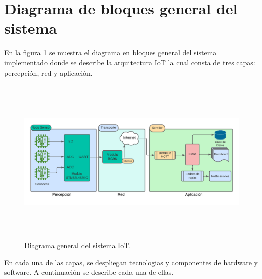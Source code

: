 \section{Diagrama de bloques general del sistema}

En la figura \ref{fig:Diagrama general del sistema IoT} se muestra el diagrama en bloques general del sistema implementado donde se describe la arquitectura IoT la cual consta de tres capas: percepción, red y aplicación.

\begin{figure}[htbp]
	\includegraphics[width=\textwidth, height=8cm]{./Figures/DiagramaDelSistema.png}
	\caption{Diagrama general del sistema IoT.}
	\label{fig:Diagrama general del sistema IoT}
\end{figure}

En cada una de las capas, se despliegan tecnologias y componentes de hardware y software. A continuación se describe cada una de ellas.

